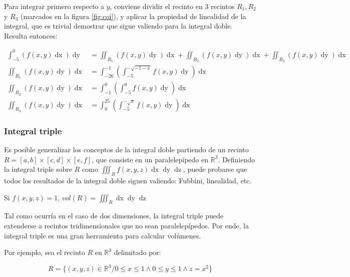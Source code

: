 \documentclass{article}
\renewcommand{\Bbb}{\mathbb}
\begin{document}
\begin{enumerate}[(A)]
Para integrar primero respecto a $y$, conviene dividir el recinto en 3 recintos $R_1, R_2$ y $R_3$ (marcados en la figura \ref{fig:coi}), y aplicar la propiedad de linealidad de la integral, que es trivial demostrar que sigue valiendo para la integral doble. Resulta entonces:

\begin{subequations}
\begin{align}
\int_{-5}^0 \left( f(x,y) \mathop{dx} \right) \mathop{dy} &= \iint_{R_1} (f(x,y) \mathop{dy}) \mathop{dx} + \iint_{R_2} (f(x,y) \mathop{dy}) \mathop{dx} + \iint_{R_3} (f(x,y) \mathop{dy}) \mathop{dx} \\
\iint_{R_1} (f(x,y) \mathop{dy}) \mathop{dx} &= \int_{-26}^{-1} \left( \int_{-5}^{-\sqrt{-1-x}} f(x,y) \mathop{dy}  \right) \mathop{dx} \\
\iint_{R_2} (f(x,y) \mathop{dy}) \mathop{dx} &= \int_{-1}^{0} \left( \int_{-5}^0 f(x,y) \mathop{dy} \right) \mathop{dx} \\
\iint_{R_3} (f(x,y) \mathop{dy}) \mathop{dx} &= \int_{0}^{25} \left( \int_{-5}^{-\sqrt{x}} f(x,y) \mathop{dy} \right) \mathop{dx}
\end{align}
\end{subequations}

\end{enumerate}

\subsubsection{Integral triple}

Es posible generalizar los conceptos de la integral doble partiendo de un recinto $R = [a,b] \times [c,d] \times [e,f]$, que consiste en un paralelepípedo en $\Bbb R^3$. Definiendo la integral triple sobre $R$ como $\iiint_R f(x,y,z) \mathop{dx} \mathop{dy} \mathop{dz}$, puede probarse que todos los resultados de la integral doble siguen valiendo: Fubbini, linealidad, etc.

Si $f(x,y,z) = 1$, $vol(R) = \iiint_R \mathop{dx} \mathop{dy} \mathop{dz}$

Tal como ocurría en el caso de dos dimensiones, la integral triple puede extenderse a recintos tridimensionales que no sean paralelepípedos. Por ende, la integral triple es una gran herramienta para calcular volúmenes.

Por ejemplo, sea el recinto $R$ en $\Bbb R^3$ delimitado por:

\begin{equation}
R = \{ (x,y,z) \in \Bbb R^3 / 0 \leq x \leq 1 \wedge 0 \leq y \leq 1 \wedge z = x^2 \}
\end{equation}
\end{document}

